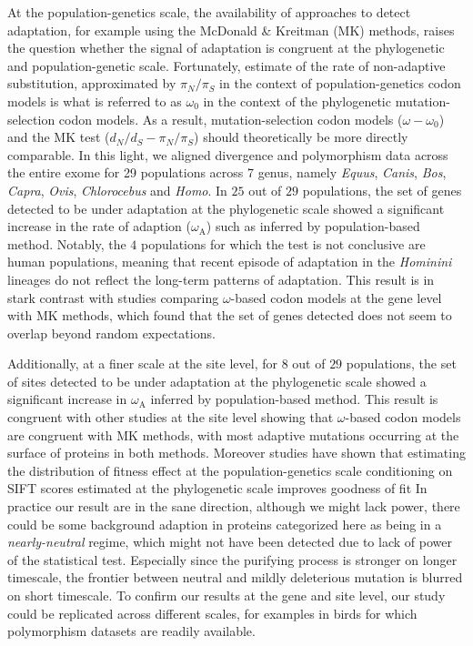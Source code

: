 \documentclass{article}
\newcommand{\dn}{d_N}
\newcommand{\ds}{d_S}
\newcommand{\dnds}{\dn / \ds}
\newcommand{\pn}{\pi_N}
\newcommand{\ps}{\pi_S}
\newcommand{\pnps}{\pn / \ps}
\begin{document}
At the population-genetics scale, the availability of approaches to detect adaptation, for example using the McDonald \& Kreitman (MK) methods, raises the question whether the signal of adaptation is congruent at the phylogenetic and population-genetic scale.
Fortunately, estimate of the rate of non-adaptive substitution, approximated by $\pnps$ in the context of population-genetics codon models is what is referred to as $\omega_{0}$ in the context of the phylogenetic mutation-selection codon models.
As a result, mutation-selection codon models ($\omega - \omega_{0}$) and the MK test ($\dnds - \pnps$) should theoretically be more directly comparable.
In this light, we aligned divergence and polymorphism data across the entire exome for 29 populations across 7 genus, namely \textit{Equus}, \textit{Canis}, \textit{Bos}, \textit{Capra}, \textit{Ovis}, \textit{Chlorocebus} and \textit{Homo}.
In $25$ out of $29$ populations, the set of genes detected to be under adaptation at the phylogenetic scale showed a significant increase in the rate of adaption ($\omega_{\mathrm{A}}$) such as inferred by population-based method.
Notably, the $4$ populations for which the test is not conclusive are human populations, meaning that recent episode of adaptation in the \textit{Hominini} lineages do not reflect the long-term patterns of adaptation.
This result is in stark contrast with studies comparing $\omega$-based codon models at the gene level with MK methods, which found that the set of genes detected does not seem to overlap beyond random expectations\cite{chen_two_2020, ziwen_he_qipian_chen_hao_yang_qingjian_chen_suhua_shi_two_2020}.

Additionally, at a finer scale at the site level, for $8$ out of $29$ populations, the set of sites detected to be under adaptation at the phylogenetic scale showed a significant increase in $\omega_{\mathrm{A}}$ inferred by population-based method.
This result is congruent with other studies at the site level showing that $\omega$-based codon models are congruent with MK methods, with most adaptive mutations occurring at the surface of proteins in both methods\cite{moutinho_impact_2019}.
Moreover studies have shown that estimating the distribution of fitness effect at the population-genetics scale conditioning on SIFT scores estimated at the phylogenetic scale improves goodness of fit \cite{chen_hunting_2021}
In practice our result are in the sane direction, although we might lack power, there could be some background adaption in proteins categorized here as being in a \textit{nearly-neutral} regime, which might not have been detected due to lack of power of the statistical test.
Especially since the purifying process is stronger on longer timescale, the frontier between neutral and mildly deleterious mutation is blurred on short timescale\cite{ho_time_2005}.
To confirm our results at the gene and site level, our study could be replicated across different scales, for examples in birds for which polymorphism datasets are readily available.
\end{document}
